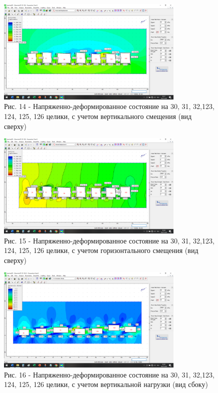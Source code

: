 \begin{figure}[H]
	\centering
	\includegraphics[width=0.8\textwidth]{media/gor/image17}
	\caption*{Рис. 14 - Напряженно-деформированное состояние на 30, 31,
	32,123, 124, 125, 126 целики, с учетом вертикального смещения (вид сверху)}
\end{figure}



\begin{figure}[H]
	\centering
	\includegraphics[width=0.8\textwidth]{media/gor/image18}
	\caption*{Рис. 15 - Напряженно-деформированное состояние на 30, 31,
	32,123, 124, 125, 126 целики, с учетом горизонтального смещения (вид сверху)}
\end{figure}



\begin{figure}[H]
	\centering
	\includegraphics[width=0.8\textwidth]{media/gor/image19}
	\caption*{Рис. 16 - Напряженно-деформированное состояние на 30, 31,
	32,123, 124, 125, 126 целики, с учетом вертикальной нагрузки (вид сбоку)}
\end{figure}




